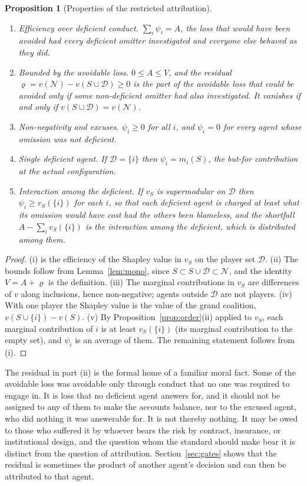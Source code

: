 \documentclass[11pt]{article}
\newcommand{\N}{\mathcal N}
\newcommand{\Dfc}{\mathcal D}
\theoremstyle{plain}
\newtheorem{proposition}{Proposition}
\theoremstyle{definition}
\begin{document}
\begin{proposition}[Properties of the restricted attribution]\label{prop:restricted}
\begin{enumerate}[label=(\roman*),nosep]
\item \emph{Efficiency over deficient conduct.} $\sum_i\psi_i=A$, the loss that would have been avoided had every deficient omitter investigated and everyone else behaved as they did.
\item \emph{Bounded by the avoidable loss.} $0\le A\le V$, and the residual $\varrho=v(\N)-v(S\cup\Dfc)\ge0$ is the part of the avoidable loss that could be avoided only if some non-deficient omitter had also investigated. It vanishes if and only if $v(S\cup\Dfc)=v(\N)$.
\item \emph{Non-negativity and excuses.} $\psi_i\ge0$ for all $i$, and $\psi_i=0$ for every agent whose omission was not deficient.
\item \emph{Single deficient agent.} If $\Dfc=\{i\}$ then $\psi_i=m_i(S)$, the but-for contribution at the actual configuration.
\item \emph{Interaction among the deficient.} If $v_S$ is supermodular on $\Dfc$ then $\psi_i\ge v_S(\{i\})$ for each $i$, so that each deficient agent is charged at least what its omission would have cost had the others been blameless, and the shortfall $A-\sum_iv_S(\{i\})$ is the interaction among the deficient, which is distributed among them.
\end{enumerate}
\end{proposition}

\begin{proof}
(i) is the efficiency of the Shapley value in $v_S$ on the player set $\Dfc$. (ii) The bounds follow from Lemma~\ref{lem:mono}, since $S\subset S\cup\Dfc\subset\N$, and the identity $V=A+\varrho$ is the definition. (iii) The marginal contributions in $v_S$ are differences of $v$ along inclusions, hence non-negative; agents outside $\Dfc$ are not players. (iv) With one player the Shapley value is the value of the grand coalition, $v(S\cup\{i\})-v(S)$. (v) By Proposition~\ref{prop:order}(ii) applied to $v_S$, each marginal contribution of $i$ is at least $v_S(\{i\})$ (its marginal contribution to the empty set), and $\psi_i$ is an average of them. The remaining statement follows from (i).
\end{proof}

The residual in part (ii) is the formal home of a familiar moral fact. Some of the avoidable loss was avoidable only through conduct that no one was required to engage in. It is loss that no deficient agent answers for, and it should not be assigned to any of them to make the accounts balance, nor to the excused agent, who did nothing it was answerable for. It is not thereby nothing. It may be owed to those who suffered it by whoever bears the risk by contract, insurance, or institutional design, and the question whom the standard should make bear it is distinct from the question of attribution. Section~\ref{sec:gates} shows that the residual is sometimes the product of another agent's decision and can then be attributed to that agent.
\end{document}

